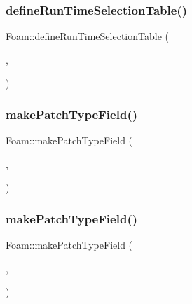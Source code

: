 \mbox{\label{namespaceFoam_ac8924145dbe200cbe5eb05d4fdfcbc01}} 
\subsubsection{\texorpdfstring{define\+Run\+Time\+Selection\+Table()}{defineRunTimeSelectionTable()}\hspace{0.1cm}{\footnotesize\ttfamily [28/28]}}
{\footnotesize\ttfamily Foam\+::define\+Run\+Time\+Selection\+Table (\begin{DoxyParamCaption}\item[{external\+I\+O\+Object\+::external\+I\+O\+Object}]{,  }\item[{dictionary}]{ }\end{DoxyParamCaption})}

\mbox{\label{namespaceFoam_aa5b92104162de53e4eb52b872cfc33c3}} 
\subsubsection{\texorpdfstring{make\+Patch\+Type\+Field()}{makePatchTypeField()}\hspace{0.1cm}{\footnotesize\ttfamily [5/7]}}
{\footnotesize\ttfamily Foam\+::make\+Patch\+Type\+Field (\begin{DoxyParamCaption}\item[{fv\+Patch\+Vector\+Field}]{,  }\item[{\hyperlink{classFoam_1_1coupledFlowRateInletVelocityFvPatchVectorField}{coupled\+Flow\+Rate\+Inlet\+Velocity\+Fv\+Patch\+Vector\+Field}}]{ }\end{DoxyParamCaption})}

\mbox{\label{namespaceFoam_aa3732345bfba2d6ccaee24f91a2a7fd3}} 
\subsubsection{\texorpdfstring{make\+Patch\+Type\+Field()}{makePatchTypeField()}\hspace{0.1cm}{\footnotesize\ttfamily [6/7]}}
{\footnotesize\ttfamily Foam\+::make\+Patch\+Type\+Field (\begin{DoxyParamCaption}\item[{fv\+Patch\+Vector\+Field}]{,  }\item[{\hyperlink{classFoam_1_1coupledFlowRateOutletVelocityFvPatchVectorField}{coupled\+Flow\+Rate\+Outlet\+Velocity\+Fv\+Patch\+Vector\+Field}}]{ }\end{DoxyParamCaption})}

